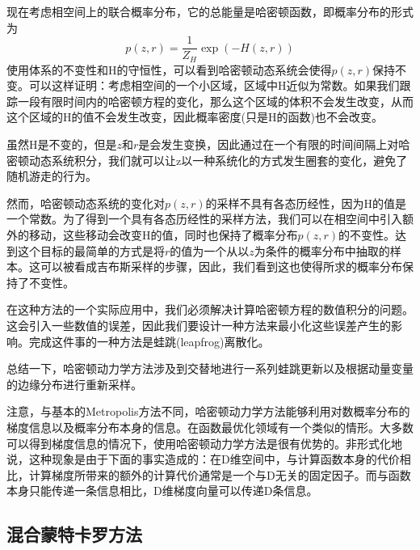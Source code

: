 现在考虑相空间上的联合概率分布，它的总能量是哈密顿函数，即概率分布的形式为
\begin{equation}
	p(z,r)=\frac{1}{Z_H}\exp (-H(z,r))
\end{equation}
使用体系的不变性和H的守恒性，可以看到哈密顿动态系统会使得$p(z,r)$保持不变。可以这样证明：考虑相空间的一个小区域，区域中H近似为常数。如果我们跟踪一段有限时间内的哈密顿方程的变化，那么这个区域的体积不会发生改变，从而这个区域的H的值不会发生改变，因此概率密度(只是H的函数)也不会改变。

虽然H是不变的，但是$z$和$r$是会发生变换，因此通过在一个有限的时间间隔上对哈密顿动态系统积分，我们就可以让z以一种系统化的方式发生圈套的变化，避免了随机游走的行为。

然而，哈密顿动态系统的变化对$p(z,r)$的采样不具有各态历经性，因为H的值是一个常数。为了得到一个具有各态历经性的采样方法，我们可以在相空间中引入额外的移动，这些移动会改变H的值，同时也保持了概率分布$p(z,r)$的不变性。达到这个目标的最简单的方式是将$r$的值为一个从以$z$为条件的概率分布中抽取的样本。这可以被看成吉布斯采样的步骤，因此，我们看到这也使得所求的概率分布保持了不变性。

在这种方法的一个实际应用中，我们必须解决计算哈密顿方程的数值积分的问题。这会引入一些数值的误差，因此我们要设计一种方法来最小化这些误差产生的影响。完成这件事的一种方法是蛙跳(leapfrog)离散化。

总结一下，哈密顿动力学方法涉及到交替地进行一系列蛙跳更新以及根据动量变量的边缘分布进行重新采样。

注意，与基本的Metropolis方法不同，哈密顿动力学方法能够利用对数概率分布的梯度信息以及概率分布本身的信息。在函数最优化领域有一个类似的情形。大多数可以得到梯度信息的情况下，使用哈密顿动力学方法是很有优势的。非形式化地说，这种现象是由于下面的事实造成的：在D维空间中，与计算函数本身的代价相比，计算梯度所带来的额外的计算代价通常是一个与D无关的固定因子。而与函数本身只能传递一条信息相比，D维梯度向量可以传递D条信息。
\subsection*{混合蒙特卡罗方法}